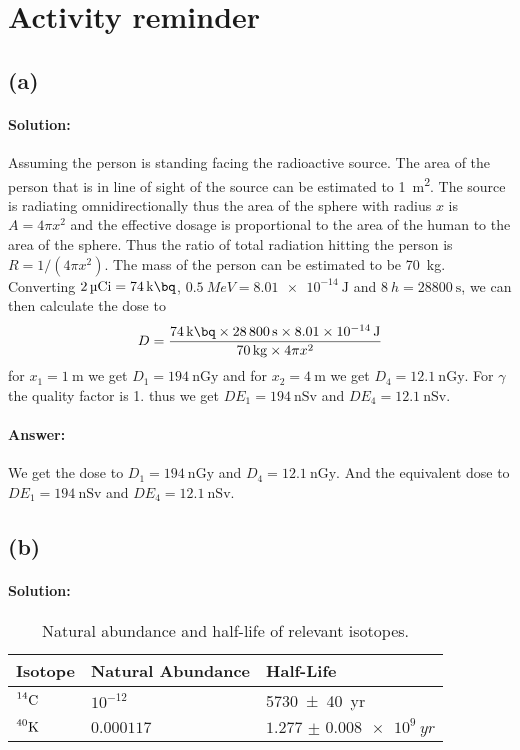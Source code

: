 \section{Activity reminder}
\subsection*{(a)}
\paragraph{Solution:} Assuming the person is standing facing the radioactive source. The area of the person that is in line of sight of the source can be estimated to \SI[]{1}{\m\squared}. The source is radiating omnidirectionally thus the area of the sphere with radius $x$ is $A = 4\pi x^2$ and the effective dosage is proportional to the area of the human to the area of the sphere. Thus the ratio of total radiation hitting the person is $R = 1/(4\pi x^2)$.  The mass of the person can be estimated to be \SI[]{70}{\kg}. Converting $\SI[]{2}{\micro Ci} = \SI[]{74}{\kilo\bq}$, $\SI[]{0.5}{MeV } = \SI[]{8.01e-14}{\joule}$ and $\SI[]{8}{h} = \SI[]{28800}{\second}$, we can then calculate the dose to
\begin{equation}
	D = \frac{\SI[]{74}{\kilo\bq} \times \SI[]{28800}{\second} \times \SI[]{8.01e-14}{\joule}}{\SI[]{70}{\kg} \times 4\pi x^2}
\end{equation}
for $x_1 = \SI[]{1}{\meter}$ we get $D_1 = \SI[]{194}{\nano\gray}$ and for $x_2 = \SI[]{4}{\meter}$ we get $D_4 = \SI[]{12.1}{\nano\gray}$. For $\gamma$ the quality factor is 1. thus we get $DE_1 = \SI[]{194}{\nano\sievert}$ and $DE_4 = \SI[]{12.1}{\nano\sievert}$.

\paragraph{Answer:} We get the dose to  $D_1 = \SI[]{194}{\nano\gray}$ and $D_4 = \SI[]{12.1}{\nano\gray}$. And the equivalent dose to $DE_1 = \SI[]{194}{\nano\sievert}$ and $DE_4 = \SI[]{12.1}{\nano\sievert}$.

\subsection*{(b)}
\paragraph{Solution:} 

\begin{table}[H]
	\centering
	\caption[]{Natural abundance and half-life of relevant isotopes.}
	\begin{tabular}{lll}
		\toprule
			\textbf{Isotope}	& \textbf{Natural Abundance}	& \textbf{Half-Life}\\
		\midrule
			$\nuc{C}{14}$			& $10^{-12}$					& \SI[]{5730(40)}{yr}\\
			$\nuc{K}{40}$			& $0.000117$					& $\SI[]{1.277(8)e9}{yr}$\\
		\bottomrule
	\end{tabular}
\end{table}

